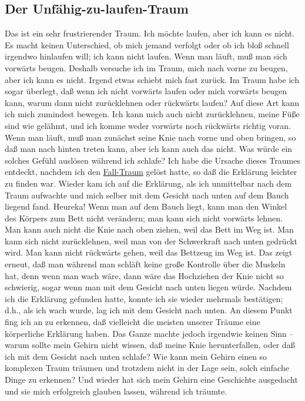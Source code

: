 \subsection{Der Unfähig-zu-laufen-Traum}
\label{c3_5c}

Das ist ein sehr frustrierender Traum.
Ich möchte laufen, aber ich kann es nicht.
Es macht keinen Unterschied, ob mich jemand verfolgt oder ob ich bloß schnell irgendwo hinlaufen will; ich kann nicht laufen.
Wenn man läuft, muß man sich vorwärts beugen.
Deshalb versuche ich im Traum, mich nach vorne zu beugen, aber ich kann es nicht.
Irgend etwas schiebt mich fast zurück.
Im Traum habe ich sogar überlegt, daß wenn ich nicht vorwärts laufen oder mich vorwärts beugen kann, warum dann nicht zurücklehnen oder rückwärts laufen?
Auf diese Art kann ich mich zumindest bewegen.
Ich kann mich auch nicht zurücklehnen, meine Füße sind wie gelähmt, und ich komme weder vorwärts noch rückwärts richtig voran.
Wenn man läuft, muß man zunächst seine Knie nach vorne und oben bringen, so daß man nach hinten treten kann, aber ich kann auch das nicht.
Was würde ein solches Gefühl auslösen während ich schlafe?
Ich habe die Ursache dieses Traumes entdeckt, nachdem ich den \hyperref[c3_5b]{Fall-Traum} gelöst hatte, so daß die Erklärung leichter zu finden war.
Wieder kam ich auf die Erklärung, als ich unmittelbar nach dem Traum aufwachte und mich selber mit dem Gesicht nach unten auf dem Bauch liegend fand. Heureka!
Wenn man auf dem Bauch liegt, kann man den Winkel des Körpers zum Bett nicht verändern; man kann sich nicht vorwärts lehnen.
Man kann auch nicht die Knie nach oben ziehen, weil das Bett im Weg ist.
Man kann sich nicht zurücklehnen, weil man von der Schwerkraft nach unten gedrückt wird.
Man kann nicht rückwärts gehen, weil das Bettzeug im Weg ist.
Das zeigt erneut, daß man während man schläft keine große Kontrolle über die Muskeln hat, denn wenn man wach wäre, dann wäre das Hochziehen der Knie nicht so schwierig, sogar wenn man mit dem Gesicht nach unten liegen würde.
Nachdem ich die Erklärung gefunden hatte, konnte ich sie wieder mehrmals bestätigen; d.h., als ich wach wurde, lag ich mit dem Gesicht nach unten.
An diesem Punkt fing ich an zu erkennen, daß vielleicht die meisten unserer Träume eine körperliche Erklärung haben.
Das Ganze machte jedoch irgendwie keinen Sinn -- warum sollte mein Gehirn nicht wissen, daß meine Knie herunterfallen, oder daß ich mit dem Gesicht nach unten schlafe?
Wie kann mein Gehirn einen so komplexen Traum träumen und trotzdem nicht in der Lage sein, solch einfache Dinge zu erkennen?
Und wieder hat sich mein Gehirn eine Geschichte ausgedacht und sie mich erfolgreich glauben lassen, während ich träumte.


